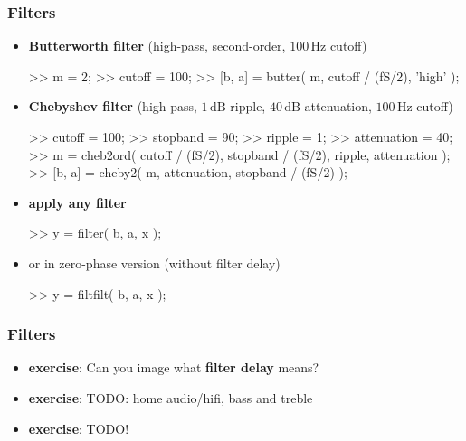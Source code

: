 \begin{frame}[fragile] %
	\frametitle{Filters}
	\begin{itemize}
		\item \textbf{Butterworth filter} (high-pass, second-order, $100\,\textrm{Hz}$ cutoff)
			\begin{code}
>> m = 2; \color{medium}%
>> cutoff = 100; \color{medium}%
>> [b, a] = butter( m, cutoff / (fS/2), 'high' );
			\end{code}
		\item \textbf{Chebyshev filter} (high-pass, $1\,\textrm{dB}$ ripple, $40\,\textrm{dB}$ attenuation, $100\,\textrm{Hz}$ cutoff)
			\begin{code}
>> cutoff = 100; \color{medium}%
>> stopband = 90; \color{medium}%
>> ripple = 1; \color{medium}%
>> attenuation = 40; \color{medium}%
>> m = cheb2ord( cutoff / (fS/2), stopband / (fS/2), ripple, attenuation );
>> [b, a] = cheby2( m, attenuation, stopband / (fS/2) );
			\end{code}
		\item \textbf{apply any filter}
			\begin{code}
>> y = filter( b, a, x ); \color{medium}%
			\end{code}
		\item or in zero-phase version (without filter delay)
			\begin{code}
>> y = filtfilt( b, a, x ); \color{medium}%
			\end{code}
	\end{itemize}
\end{frame}

\begin{frame} %
	\frametitle{Filters}
	\begin{itemize}
		\item \textbf{exercise}: Can you image what \textbf{filter delay} means?
		\item \textbf{exercise}: TODO: home audio/hifi, bass and treble
		\item \textbf{exercise}: TODO!
	\end{itemize}
\end{frame}

